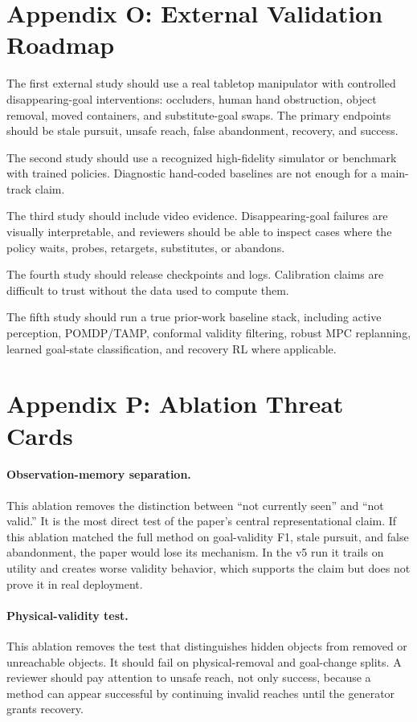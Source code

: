 \documentclass{article}
\begin{document}
\section{Appendix O: External Validation Roadmap}
The first external study should use a real tabletop manipulator with controlled disappearing-goal interventions: occluders, human hand obstruction, object removal, moved containers, and substitute-goal swaps. The primary endpoints should be stale pursuit, unsafe reach, false abandonment, recovery, and success.

The second study should use a recognized high-fidelity simulator or benchmark with trained policies. Diagnostic hand-coded baselines are not enough for a main-track claim.

The third study should include video evidence. Disappearing-goal failures are visually interpretable, and reviewers should be able to inspect cases where the policy waits, probes, retargets, substitutes, or abandons.

The fourth study should release checkpoints and logs. Calibration claims are difficult to trust without the data used to compute them.

The fifth study should run a true prior-work baseline stack, including active perception, POMDP/TAMP, conformal validity filtering, robust MPC replanning, learned goal-state classification, and recovery RL where applicable.

\section{Appendix P: Ablation Threat Cards}
\paragraph{Observation-memory separation.}
This ablation removes the distinction between ``not currently seen'' and ``not valid.'' It is the most direct test of the paper's central representational claim. If this ablation matched the full method on goal-validity F1, stale pursuit, and false abandonment, the paper would lose its mechanism. In the v5 run it trails on utility and creates worse validity behavior, which supports the claim but does not prove it in real deployment.

\paragraph{Physical-validity test.}
This ablation removes the test that distinguishes hidden objects from removed or unreachable objects. It should fail on physical-removal and goal-change splits. A reviewer should pay attention to unsafe reach, not only success, because a method can appear successful by continuing invalid reaches until the generator grants recovery.
\end{document}
